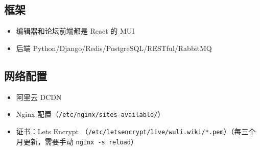 \subsection{框架}
\begin{itemize}
\item 编辑器和论坛前端都是 React 的 MUI
\item 后端 Python/Django/Redis/PostgreSQL/RESTful/RabbitMQ
\end{itemize}

\subsection{网络配置}
\begin{itemize}
\item 阿里云 DCDN
\item Nginx 配置（\verb`/etc/nginx/sites-available/`）
\item 证书：Lets Encrypt （\verb`/etc/letsencrypt/live/wuli.wiki/*.pem`）（每三个月更新，需要手动 \verb`nginx -s reload`）
\end{itemize}
